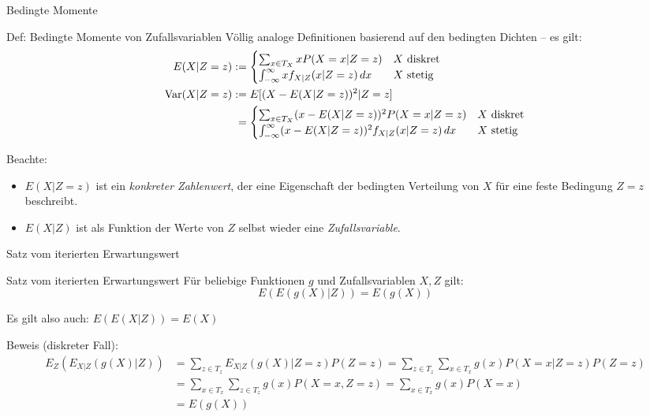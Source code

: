 \documentclass[
  10pt,
  ignorenonframetext,
]{beamer}
\providecommand{\tightlist}{%
  \setlength{\itemsep}{0pt}\setlength{\parskip}{0pt}}
\begin{document}
\begin{frame}{Bedingte Momente}
\protect\hypertarget{bedingte-momente-1}{}
\begin{block}{Def: Bedingte Momente von Zufallsvariablen}
\protect\hypertarget{def-bedingte-momente-von-zufallsvariablen}{}
Völlig analoge Definitionen basierend auf den bedingten Dichten -- es
gilt: \begin{align*}
E(X|Z = z) &:= \begin{cases} 
             \sum_{x \in T_X} x P(X = x|Z = z) & X \text{ diskret} \\
              \int_{-\infty}^\infty x f_{X|Z}(x|Z = z) \,dx & X \text{ stetig}
            \end{cases}\\
\operatorname{Var}(X|Z = z) &:= E[(X -E(X|Z = z))^2|Z = z] \\
        &\phantom{:}= \begin{cases} 
             \sum_{x \in T_X} (x - E(X|Z = z))^2 P(X = x|Z = z)  & X \text{ diskret} \\
              \int_{-\infty}^\infty (x - E(X |Z = z))^2 f_{X|Z}(x|Z = z) \,dx & X \text{ stetig}
            \end{cases}
\end{align*}
\end{block}

Beachte:

\begin{itemize}
\tightlist
\item
  \(E(X|Z = z)\) ist ein \emph{konkreter Zahlenwert}, der eine
  Eigenschaft der bedingten Verteilung von \(X\) für eine feste
  Bedingung \(Z = z\) beschreibt.
\item
  \(E(X|Z)\) ist als Funktion der Werte von \(Z\) selbst wieder eine
  \emph{Zufallsvariable}.
\end{itemize}
\end{frame}

\begin{frame}{Satz vom iterierten Erwartungswert}
\protect\hypertarget{satz-vom-iterierten-erwartungswert}{}
\begin{block}{Satz vom iterierten Erwartungswert}
\protect\hypertarget{satz-vom-iterierten-erwartungswert-1}{}
Für beliebige Funktionen \(g\) und Zufallsvariablen \(X, Z\) gilt:
\[E(E(g(X)|Z)) = E(g(X))\]
\end{block}

Es gilt also auch: \(E(E(X|Z)) = E(X)\)

Beweis (diskreter Fall): \begin{align*}
E_Z(E_{X|Z}(g(X)|Z)) &= \sum_{z \in T_z} E_{X|Z}(g(X)|Z = z) P(Z = z) =  \sum_{z \in T_z} \sum_{x \in T_x} g(x) P(X = x|Z = z) P(Z = z) \\
              &= \sum_{x \in T_x} \sum_{z \in T_z} g(x) P(X = x, Z = z) = \sum_{x \in T_x} g(x) P(X = x)\\
              &= E(g(X))
\end{align*}
\end{frame}
\end{document}
